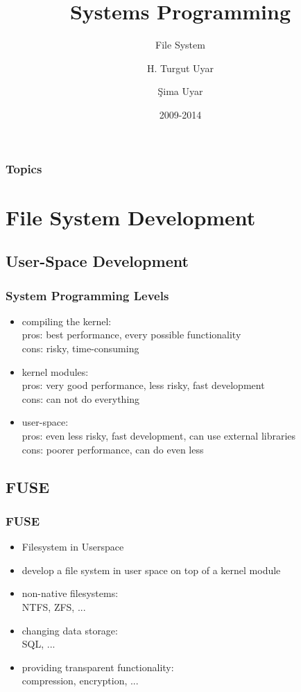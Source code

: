 \documentclass[dvipsnames]{beamer}
\title{Systems Programming}
\subtitle{File System}
\author{H. Turgut Uyar \and Şima Uyar}
\date{2009-2014}
\begin{document}
\begin{frame}
  \titlepage
\end{frame}

\begin{frame}
  \frametitle{Topics}
  \tableofcontents
\end{frame}

\section{File System Development}

\subsection{User-Space Development}

\begin{frame}
  \frametitle{System Programming Levels}

  \begin{itemize}
    \item compiling the kernel:\\
      pros: best performance, every possible functionality\\
      cons: risky, time-consuming

    \medskip
    \item kernel modules:\\
      pros: very good performance, less risky, fast development\\
      cons: can not do everything

    \pause
    \medskip
    \item user-space:\\
      pros: even less risky, fast development, can use external libraries\\
      cons: poorer performance, can do even less
  \end{itemize}
\end{frame}

\subsection{FUSE}

\begin{frame}
  \frametitle{FUSE}

  \begin{itemize}
    \item Filesystem in Userspace
    \item develop a file system in user space on top of a kernel module

    \pause
    \bigskip
    \item non-native filesystems:\\
      NTFS, ZFS, ...
    \item changing data storage:\\
      SQL, ...
    \item providing transparent functionality:\\
      compression, encryption, ...
  \end{itemize}
\end{frame}
\end{document}
